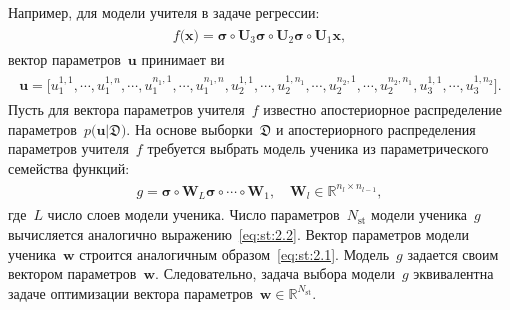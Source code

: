 \documentclass[12pt]{a&t}
\begin{document}
Например, для модели учителя в задаче регрессии:
\begin{gather}
\label{eq:st:3}
\begin{aligned}
f\bigr(\mathbf{x}\bigr) = \bm{\sigma} \circ \mathbf{U}_3 \bm{\sigma} \circ \mathbf{U}_2\bm{\sigma}\circ \mathbf{U}_1\mathbf{x},
\end{aligned}
\end{gather}
вектор параметров~$\mathbf{u}$ принимает ви
\begin{gather}
\label{eq:st:4}
\begin{aligned}
\mathbf{u} = \bigr[u_1^{1,1}, \cdots, u_1^{1,n},
                                               \cdots, 
                             u_1^{n_1,1}, \cdots, u_1^{n_1,n},  
                             u_2^{1, 1}, \cdots, u_2^{1, n_1}, 
                                                \cdots, 
                            u_2^{n_2, 1}, \cdots, u_2^{n_2, n_1},
                            u_3^{1, 1}, \cdots, u_3^{1, n_2}\bigr].
\end{aligned}
\end{gather}
Пусть для вектора параметров учителя~$f$ известно апостериорное распределение параметров~$p\bigr(\mathbf{u}|\mathfrak{D}\bigr)$. 
На основе выборки~$\mathfrak{D}$ и апостериорного распределения параметров учителя~$f$ требуется выбрать модель ученика из параметрического семейства функций:
\begin{gather}
\label{eq:st:5}
\begin{aligned}
g = \bm{\sigma} \circ \mathbf{W}_L\bm{\sigma}  \circ \cdots \circ \mathbf{W}_1, \quad \mathbf{W}_l \in \mathbb{R}^{n_l \times n_{l-1}},
\end{aligned}
\end{gather}
где~$L$ число слоев модели ученика.
Число параметров~$N_{\text{st}}$ модели ученика~$g$ вычисляется аналогично выражению~\eqref{eq:st:2.2}.
Вектор параметров модели ученика~$\mathbf{w}$ строится аналогичным образом~\eqref{eq:st:2.1}.
Модель~$g$ задается своим вектором параметров~$\mathbf{w}$.
Следовательно, задача выбора модели~$g$ эквивалентна задаче оптимизации вектора параметров~$\mathbf{w}\in\mathbb{R}^{N_{\text{st}}}$.
\end{document}
